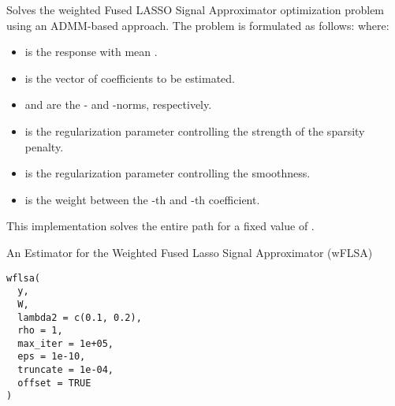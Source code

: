 \documentclass[a4paper]{book}
\begin{document}
\begin{Description}\relax
Solves the weighted Fused LASSO Signal Approximator optimization problem 
using an ADMM-based approach. The problem is formulated as follows: 
where:
\begin{itemize}

\item{}  is the response with mean .
\item{} \eqn{\beta}{} is the vector of coefficients to be estimated.
\item{}  and  are the - and -norms, respectively.
\item{}  is the regularization parameter controlling the strength of the sparsity penalty. 
\item{}  is the regularization parameter controlling the smoothness. 
\item{}  is the weight between the -th and -th coefficient.

\end{itemize}

This implementation solves the entire path for a fixed value of .

An Estimator for the Weighted Fused Lasso Signal Approximator (wFLSA)
\end{Description}
%
\begin{Usage}
\begin{verbatim}
wflsa(
  y,
  W,
  lambda2 = c(0.1, 0.2),
  rho = 1,
  max_iter = 1e+05,
  eps = 1e-10,
  truncate = 1e-04,
  offset = TRUE
)
\end{verbatim}
\end{Usage}
%
\end{document}
